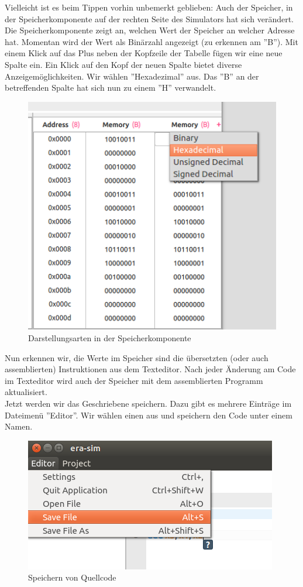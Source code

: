 Vielleicht ist es beim Tippen vorhin unbemerkt geblieben: Auch der Speicher, in der Speicherkomponente auf der rechten Seite des Simulators hat sich verändert. Die Speicherkomponente zeigt an, welchen Wert der Speicher an welcher Adresse hat. Momentan wird der Wert als Binärzahl angezeigt (zu erkennen am ''B''). Mit einem Klick auf das Plus neben der Kopfzeile der Tabelle fügen wir eine neue Spalte ein. Ein Klick auf den Kopf der neuen Spalte bietet diverse Anzeigemöglichkeiten. Wir wählen ''Hexadezimal'' aus. Das ''B'' an der betreffenden Spalte hat sich nun zu einem ''H'' verwandelt.
\begin{figure}[H]
	\centering
	\includegraphics[scale=1.0]{Images/first-steps-6.png}
	\caption{Darstellungsarten in der Speicherkomponente}
\end{figure}

Nun erkennen wir, die Werte im Speicher sind die übersetzten (oder auch assemblierten) Instruktionen aus dem Texteditor. Nach jeder Änderung am Code im Texteditor wird auch der Speicher mit dem assemblierten Programm aktualisiert.\\
Jetzt werden wir das Geschriebene speichern. Dazu gibt es mehrere Einträge im Dateimenü ''Editor''. Wir wählen einen aus und speichern den Code unter einem Namen.
\begin{figure}[H]
	\centering
	\includegraphics[scale=1.0]{Images/first-steps-7.png}
	\caption{Speichern von Quellcode}
\end{figure}

